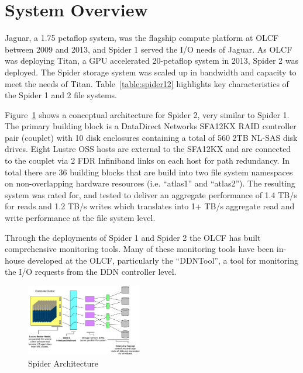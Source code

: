 \section{System Overview}
\label{sec:overview}

Jaguar, a 1.75 petaflop system, was the flagship compute platform at OLCF between
2009 and 2013, and Spider 1 served the I/O needs of Jaguar. As OLCF was
deploying Titan, a GPU accelerated 20-petaflop system in 2013, Spider 2 was
deployed. The Spider storage system was scaled up in bandwidth and capacity 
to meet the needs of Titan. Table~\ref{table:spider12} highlights key 
characteristics of the Spider 1 and 2 file systems. 


Figure~\ref{fig:arch} shows a conceptual architecture for Spider 2, very similar to Spider 1. 
The primary building block is a DataDirect Networks SFA12KX RAID controller
pair (couplet) with 10 disk enclosures containing a total of 560 2TB NL-SAS disk drives.
Eight Lustre OSS hosts are external to the SFA12KX and are connected to the couplet
via 2 FDR Infiniband links on each host for path redundancy. In total there are
36 building blocks that are build into two file system namespaces on
non-overlapping hardware resources (i.e. ``atlas1'' and ``atlas2''). The
resulting system was rated for, and tested to deliver an aggregate performance of 1.4 TB/s
for reads and 1.2 TB/s writes which translates into 1+ TB/s aggregate read and
write performance at the file system level.



Through the deployments of Spider 1 and Spider 2 the OLCF has built comprehensive
monitoring tools\cite{ddntool10:ross}. Many of these monitoring
tools have been in-house developed at the OLCF, particularly the ``DDNTool'', a
tool for monitoring the I/O requests from the DDN controller level. 



\begin{figure}[!t]
\centering
\includegraphics[width=0.45\textwidth]{./figs/spider2arch.ps}
\vspace{-0.1in}
\centering
\caption{Spider Architecture}
\label{fig:arch}
\end{figure}

